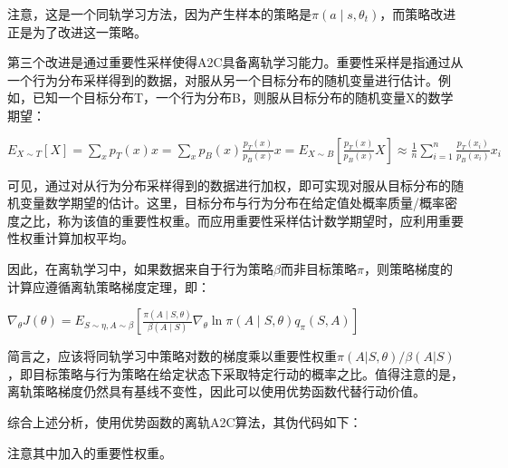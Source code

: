 \documentclass[10pt,landscape,a4paper]{article}
\begin{document}
	
	\begin{multicols*}{3}
	
	
	注意，这是一个同轨学习方法，因为产生样本的策略是$\pi\left(a\mid s,\theta_t\right)$，而策略改进正是为了改进这一策略。
	
	第三个改进是通过重要性采样使得A2C具备离轨学习能力。重要性采样是指通过从一个行为分布采样得到的数据，对服从另一个目标分布的随机变量进行估计。例如，已知一个目标分布T，一个行为分布B，则服从目标分布的随机变量X的数学期望：
	
	$E_{X\sim T}[X]=\sum_x p_T(x) x=\sum_x p_B(x)\frac{p_T(x)}{p_B(x)} x=E_{X\sim B}\left[\frac{p_T(x)}{p_B(x)} X\right]\approx\frac{1}{n}\sum_{i=1}^n\frac{p_T\left(x_i\right)}{p_B\left(x_i\right)} x_i$
	
	可见，通过对从行为分布采样得到的数据进行加权，即可实现对服从目标分布的随机变量数学期望的估计。这里，目标分布与行为分布在给定值处概率质量/概率密度之比，称为该值的重要性权重。而应用重要性采样估计数学期望时，应利用重要性权重计算加权平均。
	
	因此，在离轨学习中，如果数据来自于行为策略$\beta$而非目标策略$\pi$，则策略梯度的计算应遵循离轨策略梯度定理，即：
	
	$\nabla_{\theta} J(\theta)=E_{S\sim\eta, A\sim\beta}\left[\frac{\pi(A\mid S,\theta)}{\beta(A\mid S)}\nabla_{\theta}\ln\pi(A\mid S,\theta) q_{\pi}(S, A)\right]$
	
	简言之，应该将同轨学习中策略对数的梯度乘以重要性权重$\pi(A|S,\theta)/\beta(A|S)$，即目标策略与行为策略在给定状态下采取特定行动的概率之比。值得注意的是，离轨策略梯度仍然具有基线不变性，因此可以使用优势函数代替行动价值。
	
	综合上述分析，使用优势函数的离轨A2C算法，其伪代码如下：
	
	注意其中加入的重要性权重。
	\end{multicols*}
\end{document}
